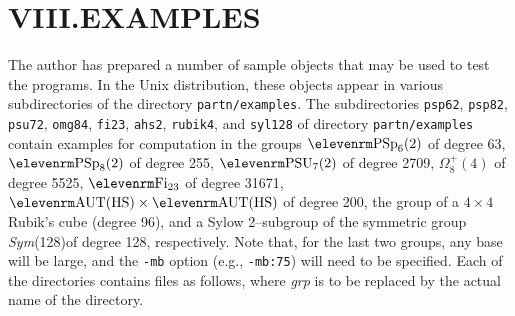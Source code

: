 \section{VIII.\quad EXAMPLES}
%
The author has prepared a number of sample objects that may be used to
test the programs.  In the Unix distribution, these objects
appear in various subdirectories of the directory {\tt partn/examples}.
%
\medbreak
The subdirectories {\tt psp62}, {\tt psp82}, {\tt psu72},
{\tt omg84}, {\tt fi23}, {\tt ahs2}, {\tt rubik4}, and 
{\tt syl128} of directory {\tt partn/examples} contain
examples for computation in the groups ${\rm PSp}_6(2)$ of degree 63,
${\rm PSp}_8(2)$ of degree 255, ${\rm PSU}_7(2)$ of degree 2709,
$\Omega^+_8(4)$ of degree 5525, ${\rm Fi}_{23}$ of degree 31671, 
${\rm AUT(HS)}\times {\rm AUT(HS)}$ of degree 200, 
the group of a $4\times 4$ Rubik's cube (degree 96), and a Sylow 2--subgroup
of the symmetric group {\it Sym\/}(128)\enskip of degree 128, respectively.
Note that, for the last two groups, any base will be large, and the 
{\tt -mb} option (e.g., {\tt -mb:75}) will need to be specified.
Each of the directories contains files as follows, where {\it grp\/} is
to be replaced by the actual name of the directory.
\medbreak
